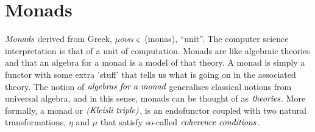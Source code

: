 \documentclass[10pt, oneside, reqno]{amsart}
\begin{document}
% 


\section{Monads} %
\label{sec:monads}
$\emph{Monads}$ derived from Greek, $\mu o \nu\alpha\varsigma$ (monas), ``unit''.
The computer science interpretation is that of a unit of computation.
Monads are like algebraic theories and that an algebra for a monad is a model of that theory. A monad is simply
a functor with some extra 'stuff' that tells us what is going on in the associated theory.
The notion of $\emph{algebras for a monad}$ generalises classical notions from universal algebra,
and in this sense, monads can be thought of as $\emph{theories}$.
More formally, a monad or $\emph{(Kleisli triple)}$, is an endofunctor coupled with two natural transformations,
$\eta$ and $\mu$ that satisfy so-called $\emph{coherence conditions}$.
\end{document}
